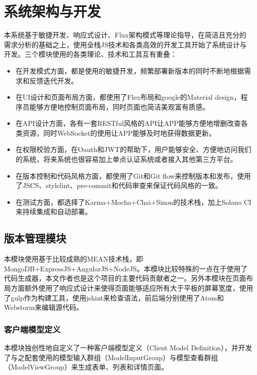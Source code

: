 
\chapter{系统架构与开发}
\label{chap:design_and_implement}
本系统基于敏捷开发、响应式设计、Flux架构模式等理论指导，在简洁且充分的需求分析的基础之上，使用全栈JS技术和各类高效的开发工具开始了系统设计与开发。三个模块使用的各类理论、技术和工具互有重叠：
\begin{itemize}
  \item 在开发模式方面，都是使用的敏捷开发，频繁部署新版本的同时不断地根据需求和反馈迭代开发。
  \item 在UI设计和页面布局方面，都使用了Flex布局和google的Material design，程序员能够方便地控制页面布局，同时页面也简洁美观富有质感。
  \item 在API设计方面，各有一套RESTful风格的API让APP能够方便地增删改查各类资源，同时WebSocket的使用让APP能够及时地获得数据更新。
  \item 在权限校验方面，在Oauth和JWT的帮助下，用户能够安全、方便地访问我们的系统，将来系统也很容易加上单点认证系统或者接入其他第三方平台。
  \item 在版本控制和代码风格方面，都使用了Git和Git flow来控制版本和发布，使用了JSCS、stylelint、pre-commit和代码审查来保证代码风格的一致。
  \item 在测试方面，都选择了Karma+Mocha+Chai+Sinon的技术栈，加上Solano CI来持续集成和自动部署。
\end{itemize}
\section{版本管理模块}
本模块使用基于比较成熟的MEAN技术栈，即MongoDB+ExpressJS+AngularJS+NodeJS。本模块比较特殊的一点在于使用了代码生成器，本文作者也是这个项目的主要代码贡献者之一。另外本模块在页面布局方面额外使用了响应式设计来使得页面能够适应所有大于平板的屏幕宽度，使用了gulp作为构建工具，使用jshint来检查语法，前后端分别使用了Atom和Webstorm来编辑源代码。
\subsection{客户端模型定义}
本模块独创性地自定义了一种客户端模型定义（Client Model Definition），并开发了与之配套使用的模型输入群组（ModelInputGroup）与模型查看群组（ModelViewGroup）来生成表单、列表和详情页面。
